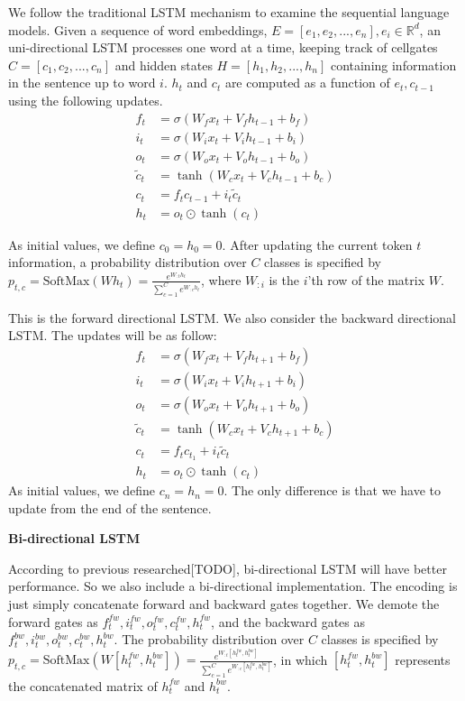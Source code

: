 \documentclass{article}
\begin{document}
We follow the traditional LSTM mechanism to examine the sequential language models. Given a sequence of word embeddings, $E = [e_1, e_2, ... , e_n], e_i \in \mathbb{R}^d$, an  uni-directional LSTM processes one word at a time, keeping track of cellgates $C = [c_1, c_2, ... , c_n]$ and hidden states $H = [h_1, h_2, ... , h_n]$ containing information in the sentence up to word $i$. $h_t$ and $c_t$ are computed as a function of $e_t, c_{t-1}$ using the following updates.
\begin{align}
f_t & = \sigma(W_f x_t + V_f h_{t - 1} + b_f) \\
i_t & = \sigma(W_i x_t + V_i h_{t - 1} + b_i) \\
o_t & = \sigma(W_o x_t + V_o h_{t - 1} + b_o) \\
\tilde{c}_t & = \tanh(W_c x_t + V_c h_{t - 1} + b_c) \\
c_t & = f_t c_{t - 1} + i_t \tilde{c}_t \\
h_t & = o_t \odot \tanh(c_t)
\end{align}

As initial values, we define $c_0=h_0=0$. 
After updating the current token $t$ information, a probability distribution over $C$ classes is specified by $p_{t, c} = \text{SoftMax}(W h_t) = \frac{e^{W_{:t} h_t}}{\sum_{c = 1} ^ C e^{W_{:c} h_t}}$, where $W_{:i}$ is the $i$'th row of the matrix $W$.

This is the forward directional LSTM. We also consider the backward directional LSTM. The updates will be as follow:
\begin{align}
f_t & = \sigma(W_f x_t + V_f h_{t + 1} + b_f) \\
i_t & = \sigma(W_i x_t + V_i h_{t + 1} + b_i) \\
o_t & = \sigma(W_o x_t + V_o h_{t + 1} + b_o) \\
\tilde{c}_t & = \tanh(W_c x_t + V_c h_{t + 1} + b_c) \\
c_t & = f_t c_{t _ 1} + i_t \tilde{c}_t \\
h_t & = o_t \odot \tanh(c_t)
\end{align}
As initial values, we define $c_n=h_n=0$. The only difference is that we have to update from the end of the sentence.

\textbf{Bi-directional LSTM}

According to previous researched[TODO], bi-directional LSTM will have better performance. So we also include a bi-directional implementation. The encoding is just simply concatenate forward and backward gates together. We demote the forward gates as $f_t^{fw}, i_t^{fw}, o_t^{fw}, c_t^{fw}, h_t^{fw}$, and the backward gates as $f_t^{bw}, i_t^{bw}, o_t^{bw}, c_t^{bw}, h_t^{bw}$. The probability distribution over $C$ classes is specified by $p_{t, c} = \text{SoftMax}(W [h_t^{fw}, h_t^{bw}]) = \frac{e^{W_{:t} [h_t^{fw}, h_t^{bw}]}}{\sum_{c = 1} ^ C e^{W_{:c} [h_t^{fw}, h_t^{bw}]}}$, in which $[h_t^{fw}, h_t^{bw}]$ represents the concatenated matrix of $h_t^{fw}$ and $h_t^{bw}$.
\end{document}
